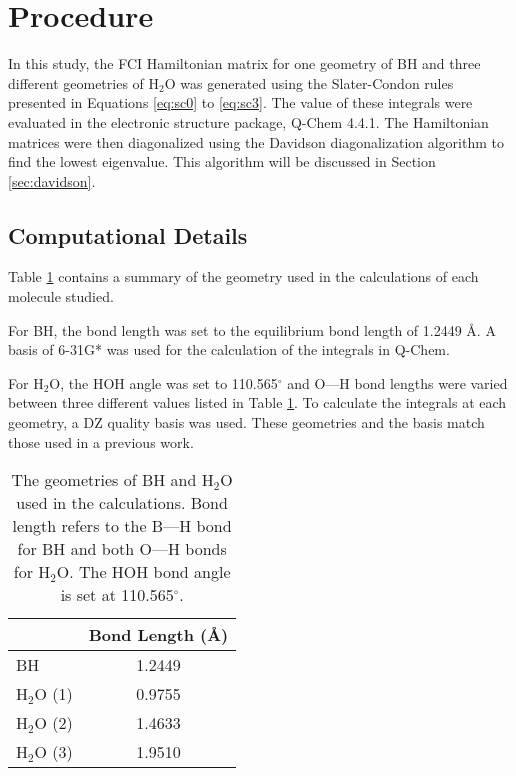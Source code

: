 \documentclass[final,3p,times,twocolumn]{elsarticle}
\begin{document}
\section{Procedure}

In this study, the FCI Hamiltonian matrix for one geometry of BH and three different geometries of H$_2$O was generated using the Slater-Condon rules presented in Equations \eqref{eq:sc0} to \eqref{eq:sc3}. The value of these integrals were evaluated in the electronic structure package, Q-Chem 4.4.1.\cite{qchem} The Hamiltonian matrices were then diagonalized using the Davidson diagonalization algorithm\cite{davidson,liu} to find the lowest eigenvalue. This algorithm will be discussed in Section \ref{sec:davidson}.

\subsection{Computational Details} \label{sec:integrals}

Table \ref{tab:geo} contains a summary of the geometry used in the calculations of each molecule studied.

For BH, the bond length was set to the equilibrium bond length of 1.2449 \AA.\cite{cccbdb} A basis of 6-31G* was used for the calculation of the integrals in Q-Chem. 

For H$_2$O, the HOH angle was set to 110.565$^\circ$ and O---H bond lengths were varied between three different values listed in Table \ref{tab:geo}. To calculate the integrals at each geometry, a DZ quality basis was used. These geometries and the basis match those used in a previous work.\cite{handy-1983}

\begin{table}
\centering
\begin{tabular}{l|c}
\hline\hline
& Bond Length (\AA) \\ \hline
BH & 1.2449 \\ \hline
H$_2$O (1) & 0.9755\\
H$_2$O (2) & 1.4633\\
H$_2$O (3) & 1.9510\\ \hline\hline
\end{tabular}
\caption{The geometries of BH and H$_2$O used in the calculations. Bond length refers to the B---H bond for BH and both O---H bonds for H$_2$O. The HOH bond angle is set at 110.565$^\circ$.}
\label{tab:geo}
\end{table}
\end{document}
